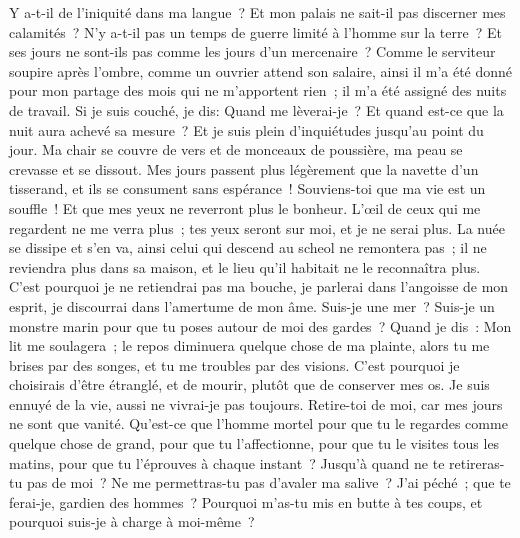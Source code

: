 \begin{multicols}{2}
Y a-t-il de l'iniquité dans ma langue~? Et mon palais ne sait-il pas discerner mes calamités~? 
\VerseOne{}N'y a-t-il pas un temps de guerre limité à l'homme sur la terre~? Et ses jours ne sont-ils pas comme les jours d'un mercenaire~?
Comme le serviteur soupire après l'ombre, comme un ouvrier attend son salaire, 
ainsi il m'a été donné pour mon partage des mois qui ne m'apportent rien~; il m'a été assigné des nuits de travail.
Si je suis couché, je dis: Quand me lèverai-je~? Et quand est-ce que la nuit aura achevé sa mesure~? Et je suis plein d'inquiétudes jusqu'au point du jour.
Ma chair se couvre de vers et de monceaux de poussière, ma peau se crevasse et se dissout.
Mes jours passent plus légèrement que la navette d'un tisserand, et ils se consument sans espérance~!
Souviens-toi que ma vie est un souffle~! Et que mes yeux ne reverront plus le bonheur.
L'œil de ceux qui me regardent ne me verra plus~; tes yeux seront sur moi, et je ne serai plus.
La nuée se dissipe et s'en va, ainsi celui qui descend au scheol ne remontera pas~;
il ne reviendra plus dans sa maison, et le lieu qu'il habitait ne le reconnaîtra plus.
C'est pourquoi je ne retiendrai pas ma bouche, je parlerai dans l'angoisse de mon esprit, je discourrai dans l'amertume de mon âme.
Suis-je une mer~? Suis-je un monstre marin pour que tu poses autour de moi des gardes~?
Quand je dis~: Mon lit me soulagera~; le repos diminuera quelque chose de ma plainte,
alors tu me brises par des songes, et tu me troubles par des visions.
C'est pourquoi je choisirais d'être étranglé, et de mourir, plutôt que de conserver mes os.
Je suis ennuyé de la vie, aussi ne vivrai-je pas toujours. Retire-toi de moi, car mes jours ne sont que vanité.
Qu'est-ce que l'homme mortel pour que tu le regardes comme quelque chose de grand, pour que tu l'affectionne,
pour que tu le visites tous les matins, pour que tu l'éprouves à chaque instant~?
Jusqu'à quand ne te retireras-tu pas de moi~? Ne me permettras-tu pas d'avaler ma salive~?
J'ai péché~; que te ferai-je, gardien des hommes~? Pourquoi m'as-tu mis en butte à tes coups, et pourquoi suis-je à charge à moi-même~?

\end{multicols}
